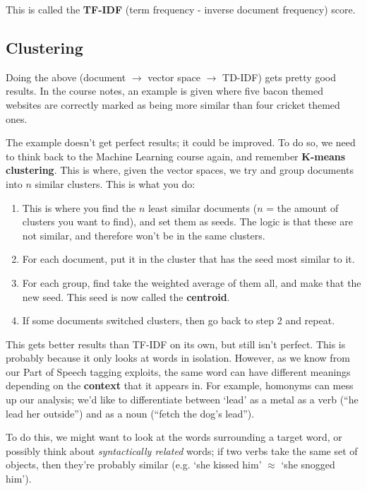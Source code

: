 This is called the \textbf{TF-IDF} (term frequency - inverse document frequency)
score.

\subsection{Clustering}

Doing the above (document $\rightarrow$ vector space $\rightarrow$ TD-IDF) gets
pretty good results. In the course notes, an example is given where five bacon
themed websites are correctly marked as being more similar than four cricket
themed ones.

The example doesn't get perfect results; it could be improved. To do so, we need
to think back to the Machine Learning course again, and remember \textbf{K-means
clustering}. This is where, given the vector spaces, we try and group documents
into $n$ similar clusters. This is what you do:

\begin{enumerate}
  \item This is where you find the $n$ least similar documents ($n$ = the
    amount of clusters you want to find), and set them as seeds. The logic is
    that these are not similar, and therefore won't be in the same clusters.
  \item For each document, put it in the cluster that has the seed most similar 
    to it.
  \item For each group, find take the weighted average of them all, and make 
    that the new seed. This seed is now called the \textbf{centroid}.
  \item If some documents switched clusters, then go back to step 2 and repeat.
\end{enumerate}

This gets better results than TF-IDF on its own, but still isn't perfect. This
is probably because it only looks at words in isolation. However, as we know
from our Part of Speech tagging exploits, the same word can have different
meanings depending on the \textbf{context} that it appears in. For example,
homonyms can mess up our analysis; we'd like to differentiate between `lead' as
a metal as a verb (``he lead her outside'') and as a noun (``fetch the dog's
lead'').


To do this, we might want to look at the words surrounding a target word, or
possibly think about \textit{syntactically related} words; if two verbs take the
same set of objects, then they're probably similar (e.g. `she kissed him'
$\approx$ `she snogged him').

